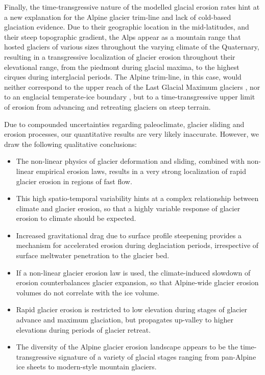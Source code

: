 \documentclass[esurf, manuscript]{copernicus}
\begin{document}
    Finally, the time-transgressive nature of the modelled glacial erosion
    rates hint at a new explanation for the Alpine glacier trim-line and lack
    of cold-based glaciation evidence. Due to their geographic location in the
    mid-latitudes, and their steep topographic gradient, the Alps appear as a
    mountain range that hosted glaciers of various sizes throughout the varying
    climate of the Quaternary, resulting in a transgressive localization of
    glacier erosion throughout their elevational range, from the piedmont
    during glacial maxima, to the highest cirques during interglacial periods.
    The Alpine trim-line, in this case, would neither correspond to the upper
    reach of the Last Glacial Maximum glaciers \citep[e.g.,][]{Kelly.etal.2004},
    nor to an englacial temperate-ice boundary \citep{Coutterand.2010,
    Seguinot.etal.2018}, but to a time-transgressive upper limit of erosion from
    advancing and retreating glaciers on steep terrain.


\conclusions

    Due to compounded uncertainties regarding paleoclimate, glacier sliding and
    erosion processes, our quantitative results are very likely inaccurate.
    However, we draw the following qualitative conclusions:
    \begin{itemize}
      \item The non-linear physics of glacier deformation and sliding, combined
        with non-linear empirical erosion laws, results in a very strong
        localization of rapid glacier erosion in regions of fast flow.
      \item This high spatio-temporal variability hints at a complex
        relationship between climate and glacier erosion, so that a highly
        variable response of glacier erosion to climate should be expected.
      \item Increased gravitational drag due to surface profile steepening
        provides a mechanism
        for accelerated erosion during deglaciation periods, irrespective of
        surface meltwater penetration to the glacier bed.
      \item If a non-linear glacier erosion law is used, the climate-induced
        slowdown of erosion counterbalances glacier expansion, so that
        Alpine-wide glacier erosion volumes do not correlate with the ice volume.
      \item Rapid glacier erosion is restricted to low elevation during stages
        of glacier advance and maximum glaciation, but propagates up-valley to
        higher elevations during periods of glacier retreat.
      \item The diversity of the Alpine glacier erosion landscape appears to
        be the time-transgressive signature of a variety of glacial stages
        ranging from pan-Alpine ice sheets to modern-style mountain glaciers.
    \end{itemize}
\end{document}
